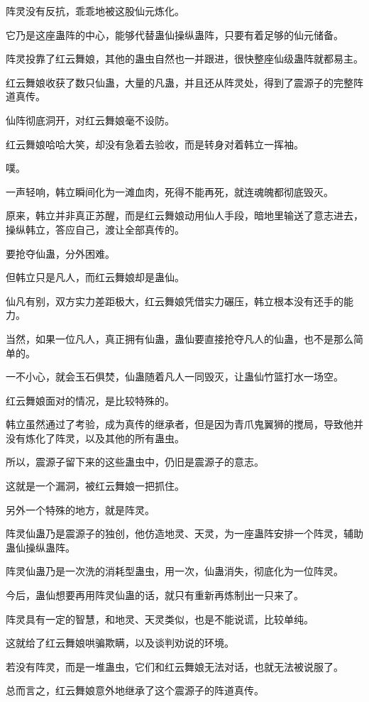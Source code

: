 \begin{this_body}
阵灵没有反抗，乖乖地被这股仙元炼化。

它乃是这座蛊阵的中心，能够代替蛊仙操纵蛊阵，只要有着足够的仙元储备。

阵灵投靠了红云舞娘，其他的蛊虫自然也一并跟进，很快整座仙级蛊阵就都易主。

红云舞娘收获了数只仙蛊，大量的凡蛊，并且还从阵灵处，得到了震源子的完整阵道真传。

仙阵彻底洞开，对红云舞娘毫不设防。

红云舞娘哈哈大笑，却没有急着去验收，而是转身对着韩立一挥袖。

噗。

一声轻响，韩立瞬间化为一滩血肉，死得不能再死，就连魂魄都彻底毁灭。

原来，韩立并非真正苏醒，而是红云舞娘动用仙人手段，暗地里输送了意志进去，操纵韩立，答应自己，渡让全部真传的。

要抢夺仙蛊，分外困难。

但韩立只是凡人，而红云舞娘却是蛊仙。

仙凡有别，双方实力差距极大，红云舞娘凭借实力碾压，韩立根本没有还手的能力。

当然，如果一位凡人，真正拥有仙蛊，蛊仙要直接抢夺凡人的仙蛊，也不是那么简单的。

一不小心，就会玉石俱焚，仙蛊随着凡人一同毁灭，让蛊仙竹篮打水一场空。

红云舞娘面对的情况，是比较特殊的。

韩立虽然通过了考验，成为真传的继承者，但是因为青爪鬼翼狮的搅局，导致他并没有炼化了阵灵，以及其他的所有蛊虫。

所以，震源子留下来的这些蛊虫中，仍旧是震源子的意志。

这就是一个漏洞，被红云舞娘一把抓住。

另外一个特殊的地方，就是阵灵。

阵灵仙蛊乃是震源子的独创，他仿造地灵、天灵，为一座蛊阵安排一个阵灵，辅助蛊仙操纵蛊阵。

阵灵仙蛊乃是一次洗的消耗型蛊虫，用一次，仙蛊消失，彻底化为一位阵灵。

今后，蛊仙想要再用阵灵仙蛊的话，就只有重新再炼制出一只来了。

阵灵具有一定的智慧，和地灵、天灵类似，也是不能说谎，比较单纯。

这就给了红云舞娘哄骗欺瞒，以及谈判劝说的环境。

若没有阵灵，而是一堆蛊虫，它们和红云舞娘无法对话，也就无法被说服了。

总而言之，红云舞娘意外地继承了这个震源子的阵道真传。


\end{this_body}
